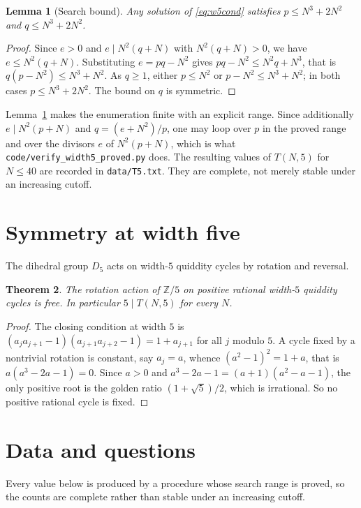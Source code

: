 \documentclass[11pt]{article}
\theoremstyle{plain}
\newtheorem{theorem}{Theorem}[section]
\newtheorem{lemma}[theorem]{Lemma}
\theoremstyle{definition}
\newcommand{\Z}{\mathbb{Z}}
\begin{document}
\begin{lemma}[Search bound]\label{lem:w5bound}
Any solution of \eqref{eq:w5cond} satisfies $p\le N^3+2N^2$ and $q\le N^3+2N^2$.
\end{lemma}

\begin{proof}
Since $e>0$ and $e\mid N^2(q+N)$ with $N^2(q+N)>0$, we have $e\le N^2(q+N)$. Substituting
$e=pq-N^2$ gives $pq-N^2\le N^2q+N^3$, that is $q(p-N^2)\le N^3+N^2$. As $q\ge 1$, either
$p\le N^2$ or $p-N^2\le N^3+N^2$; in both cases $p\le N^3+2N^2$. The bound on $q$ is
symmetric.
\end{proof}

Lemma~\ref{lem:w5bound} makes the enumeration finite with an explicit range. Since
additionally $e\mid N^2(p+N)$ and $q=(e+N^2)/p$, one may loop over $p$ in the proved range
and over the divisors $e$ of $N^2(p+N)$, which is what \texttt{code/verify\_width5\_proved.py}
does. The resulting values of $T(N,5)$ for $N\le 40$ are recorded in
\texttt{data/T5.txt}. They are complete, not merely stable under an increasing cutoff.

\section{Symmetry at width five}\label{sec:sym}

The dihedral group $D_5$ acts on width-$5$ quiddity cycles by rotation and reversal.

\begin{theorem}\label{thm:free}
The rotation action of $\Z/5$ on positive rational width-$5$ quiddity cycles is free. In
particular $5\mid T(N,5)$ for every $N$.
\end{theorem}

\begin{proof}
The closing condition at width $5$ is
$(a_ja_{j+1}-1)(a_{j+1}a_{j+2}-1)=1+a_{j+1}$ for all $j$ modulo $5$. A cycle fixed by a
nontrivial rotation is constant, say $a_j=a$, whence $(a^2-1)^2=1+a$, that is
$a(a^3-2a-1)=0$. Since $a>0$ and $a^3-2a-1=(a+1)(a^2-a-1)$, the only positive root is the
golden ratio $(1+\sqrt5)/2$, which is irrational. So no positive rational cycle is fixed.
\end{proof}

\section{Data and questions}\label{sec:data}

Every value below is produced by a procedure whose search range is proved, so the counts are
complete rather than stable under an increasing cutoff.
\end{document}
